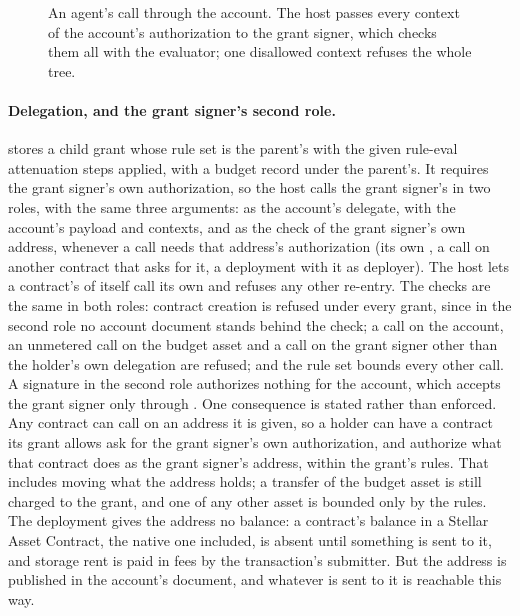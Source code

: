 \begin{figure}[t]
\centering
\resizebox{\linewidth}{!}{}
\caption{An agent's call through the account. The host passes every context of
the account's authorization to the grant signer, which checks them all with
the evaluator; one disallowed context refuses the whole tree.}
\label{fig:soroban}
\end{figure}

\paragraph{Delegation, and the grant signer's second role.}
 stores a child grant whose
rule set is the parent's with the given rule-eval attenuation steps applied,
with a budget record under the parent's. It requires the grant signer's own authorization, so the
host calls the grant signer's  in two roles, with the
same three arguments: as the account's delegate, with the account's payload
and contexts, and as the check of the grant signer's own address, whenever a
call needs that address's authorization (its own , a call on
another contract that asks for it, a deployment with it as deployer). The
host lets a contract's  of itself call its own
 and refuses any other re-entry. The checks are the
same in both roles: contract creation is refused under every
grant, since in the second role no account document
stands behind the check; a call on the account, an unmetered call on the
budget asset and a call on the grant signer other than the holder's own
delegation are refused; and the rule set bounds every other call. A
signature in the second role authorizes nothing for the account, which
accepts the grant signer only through
. One consequence is
stated rather than enforced. Any contract can call  on an
address it is given, so a holder can have a contract its grant allows ask
for the grant signer's own authorization, and authorize what that contract
does as the grant signer's address, within the grant's rules. That includes
moving what the address holds; a transfer of the budget asset is still
charged to the grant, and one of any other asset is bounded only by the
rules.
The deployment gives the address no balance: a contract's balance in a
Stellar Asset Contract, the native one included, is absent until something
is sent to it, and storage rent is paid in fees by the transaction's
submitter. But the address is published in the account's document, and
whatever is sent to it is reachable this way.

